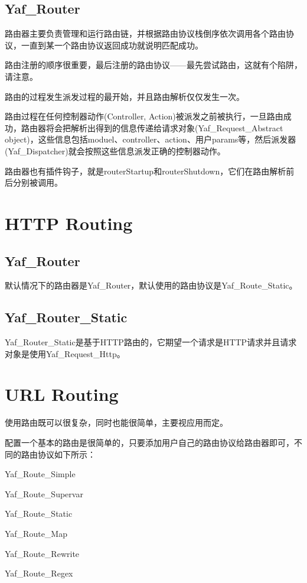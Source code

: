 \subsection{Yaf\_Router}


路由器主要负责管理和运行路由链，并根据路由协议栈倒序依次调用各个路由协议，一直到某一个路由协议返回成功就说明匹配成功。

路由注册的顺序很重要，最后注册的路由协议——最先尝试路由，这就有个陷阱，请注意。

路由的过程发生派发过程的最开始，并且路由解析仅仅发生一次。

路由过程在任何控制器动作(Controller, Action)被派发之前被执行，一旦路由成功，路由器将会把解析出得到的信息传递给请求对象(Yaf\_Request\_Abstract object)，这些信息包括moduel、controller、action、用户params等，然后派发器(Yaf\_Dispatcher)就会按照这些信息派发正确的控制器动作。

路由器也有插件钩子，就是routerStartup和routerShutdown，它们在路由解析前后分别被调用。




\section{HTTP Routing}

\subsection{Yaf\_Router}

默认情况下的路由器是Yaf\_Router，默认使用的路由协议是Yaf\_Route\_Static。

\subsection{Yaf\_Router\_Static}


Yaf\_Router\_Static是基于HTTP路由的，它期望一个请求是HTTP请求并且请求对象是使用Yaf\_Request\_Http。





\section{URL Routing}

使用路由既可以很复杂，同时也能很简单，主要视应用而定。

配置一个基本的路由是很简单的，只要添加用户自己的路由协议给路由器即可，不同的路由协议如下所示：

\begin{compactitem}
\item Yaf\_Route\_Simple
\item Yaf\_Route\_Supervar
\item Yaf\_Route\_Static
\item Yaf\_Route\_Map
\item Yaf\_Route\_Rewrite
\item Yaf\_Route\_Regex
\end{compactitem}


